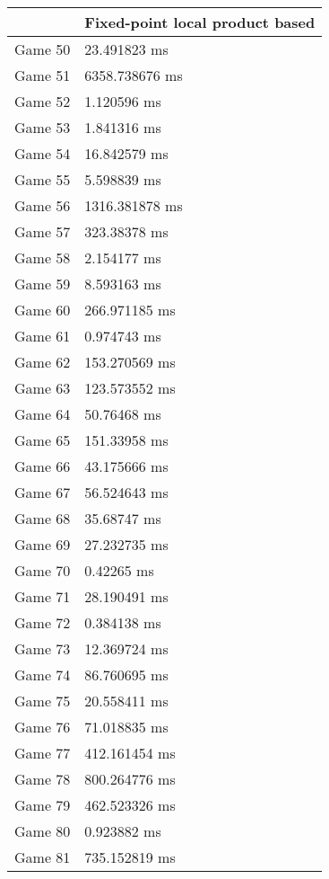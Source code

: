 \begin{multicols}{2}
\begin{tabular}{|l|l|}
\end{tabular}\\
\begin{tabular}{|l|l|}
	\hline
	& Fixed-point local product based \\ \hline
	Game 50 & 23.491823 ms \\ \hline
	Game 51 & 6358.738676 ms \\ \hline
	Game 52 & 1.120596 ms \\ \hline
	Game 53 & 1.841316 ms \\ \hline
	Game 54 & 16.842579 ms \\ \hline
	Game 55 & 5.598839 ms \\ \hline
	Game 56 & 1316.381878 ms \\ \hline
	Game 57 & 323.38378 ms \\ \hline
	Game 58 & 2.154177 ms \\ \hline
	Game 59 & 8.593163 ms \\ \hline
	Game 60 & 266.971185 ms \\ \hline
	Game 61 & 0.974743 ms \\ \hline
	Game 62 & 153.270569 ms \\ \hline
	Game 63 & 123.573552 ms \\ \hline
	Game 64 & 50.76468 ms \\ \hline
	Game 65 & 151.33958 ms \\ \hline
	Game 66 & 43.175666 ms \\ \hline
	Game 67 & 56.524643 ms \\ \hline
	Game 68 & 35.68747 ms \\ \hline
	Game 69 & 27.232735 ms \\ \hline
	Game 70 & 0.42265 ms \\ \hline
	Game 71 & 28.190491 ms \\ \hline
	Game 72 & 0.384138 ms \\ \hline
	Game 73 & 12.369724 ms \\ \hline
	Game 74 & 86.760695 ms \\ \hline
	Game 75 & 20.558411 ms \\ \hline
	Game 76 & 71.018835 ms \\ \hline
	Game 77 & 412.161454 ms \\ \hline
	Game 78 & 800.264776 ms \\ \hline
	Game 79 & 462.523326 ms \\ \hline
	Game 80 & 0.923882 ms \\ \hline
	Game 81 & 735.152819 ms \\ \hline

\end{tabular}
\end{multicols}
